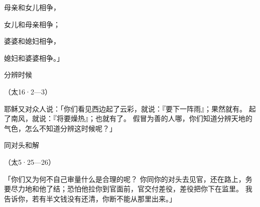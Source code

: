 {\par }{\Q 母亲和女儿相争，
\par }{\Q 女儿和母亲相争；
\par }{\Q 婆婆和媳妇相争，
\par }{\Q 媳妇和婆婆相争。」
\par }{\SH 分辨时候
\par }{\R （太16·2—3）
\par }{\PP {}耶稣又对众人说：「你们看见西边起了云彩，就说：『要下一阵雨』；果然就有。
起了南风，就说：『将要燥热』；也就有了。
假冒为善的人哪，你们知道分辨天地的气色，怎么不知道分辨这时候呢？」
\par }{\SH 同对头和解
\par }{\R （太5·25—26）
\par }{\PP {}「你们又为何不自己审量什么是合理的呢？
你同{}你的对头去见官，还在路上，务要尽力地和他了结；恐怕他拉你到官面前，官交付差役，差役把你下在监里。
我告诉你，若有半文钱没有还清，你断不能从那里出来。」

}
